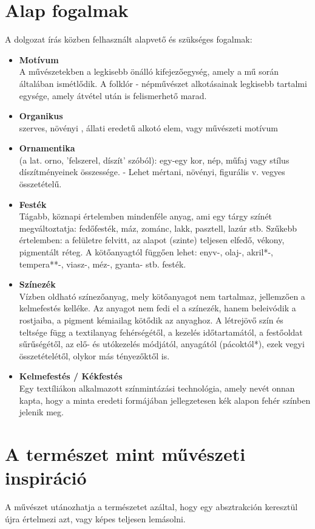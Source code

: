 \documentclass[fontsize=12pt, appendixprefix=true]{scrreprt}
\begin{document}
\section{Alap fogalmak}
A dolgozat írás közben felhasznált alapvető és szükséges fogalmak:
\begin{itemize}
	\item \textbf{Motívum} \\  A művészetekben a legkisebb önálló kifejezőegység, amely a mű során általában ismétlődik. A folklór - népművészet alkotásainak legkisebb tartalmi egysége, amely átvétel után is felismerhető marad.
	\item \textbf{Organikus} \\ szerves, növényi , állati eredetű alkotó elem, vagy művészeti motívum
	\item \textbf{Ornamentika} \\ (a lat. orno, 'felszerel, díszít' szóból): egy-egy kor, nép, műfaj vagy stílus díszítményeinek összessége. - Lehet mértani, növényi, figurális v. vegyes összetételű.
	\item \textbf{Festék} \\ Tágabb, köznapi értelemben mindenféle anyag, ami egy tárgy színét megváltoztatja: fedőfesték, máz, zománc, lakk, pasztell, lazúr stb. Szűkebb értelemben: a felületre felvitt, az alapot (szinte) teljesen elfedő, vékony, pigmentált réteg. A kötőanyagtól függően lehet: enyv-, olaj-, akril*-, tempera**-, viasz-, méz-, gyanta- stb. festék.
	\item \textbf{Színezék} \\
	Vízben oldható színezőanyag, mely kötőanyagot nem tartalmaz, jellemzően a kelmefestés kelléke. Az anyagot nem fedi el a színezék, hanem beleivódik a rostjaiba, a pigment kémiailag kötődik az anyaghoz. A létrejövő szín és teltsége függ a textilanyag fehérségétől, a kezelés időtartamától, a festőoldat sűrűségétől, az elő- és utókezelés módjától, anyagától (pácoktól*), ezek vegyi összetételétől, olykor más tényezőktől is.
	\item \textbf{Kelmefestés / Kékfestés} \\ 
	Egy textíliákon alkalmazott színmintázási technológia, amely nevét onnan kapta, hogy a minta eredeti formájában jellegzetesen kék alapon fehér színben jelenik meg.
	\end{itemize}

\section{A természet mint művészeti inspiráció}
A művészet utánozhatja a természetet azáltal, hogy egy absztrakción keresztül újra értelmezi azt, vagy képes teljesen lemásolni.
\end{document}

